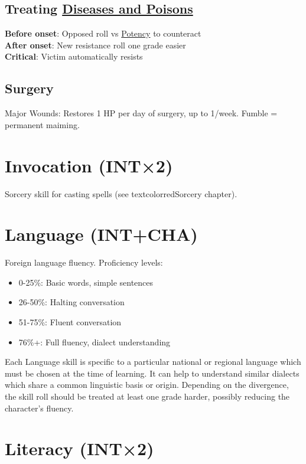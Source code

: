 \documentclass[10pt]{article}
\begin{document}
\subsection{Treating \hyperref[sec:disease-poison]{Diseases and Poisons}}
\textbf{Before onset}: Opposed roll vs \hyperref[sec:disease-poison]{Potency} to counteract\\
\textbf{After onset}: New resistance roll one grade easier\\
\textbf{Critical}: Victim automatically resists

\subsection{Surgery}
Major Wounds: Restores 1 HP per day of surgery, up to 1/week. Fumble = permanent maiming.

\section{Invocation (INT×2)}
\label{skill:invocation}

Sorcery skill for casting spells (see textcolor{red}{Sorcery chapter}).

\section{Language (INT+CHA)}
\label{skill:language}

Foreign language fluency. Proficiency levels:

\begin{itemize}
    \item 0-25\%: Basic words, simple sentences
    \item 26-50\%: Halting conversation
    \item 51-75\%: Fluent conversation
    \item 76\%+: Full fluency, dialect understanding
\end{itemize}
Each Language skill is specific to a particular national or regional language which must be chosen at the time of learning. It can help to understand similar dialects which share a common linguistic basis or origin. Depending on the divergence, the skill roll should be treated at least one grade harder, possibly reducing the character’s fluency.


\section{Literacy (INT×2)}
\label{skill:literacy}
\end{document}
